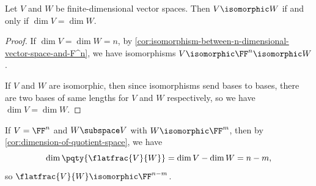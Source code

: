 \begin{corollary}
    Let \(V\) and \(W\) be finite-dimensional vector spaces. Then \(V \isomorphic W\) if and only if \(\dim V = \dim W\).
\end{corollary}

\begin{proof}
    If \(\dim V = \dim W = n\), by \autoref{cor:isomorphism-between-n-dimensional-vector-space-and-F^n}, we have isomorphisms \(V \isomorphic \FF^n \isomorphic W\).

    If \(V\) and \(W\) are isomorphic, then since isomorphisms send bases to bases, there are two bases of same lengths for \(V\) and \(W\) respectively, so we have \(\dim V = \dim W\).
\end{proof}

\begin{example}
    If \(V = \FF^n\) and \(W \subspace V\) with \(W \isomorphic \FF^m\), then by \autoref{cor:dimension-of-quotient-space}, we have
    \[
        \dim \pqty{\flatfrac{V}{W}} = \dim V - \dim W = n - m,
    \]
    so \(\flatfrac{V}{W} \isomorphic \FF^{n - m}\).
\end{example}